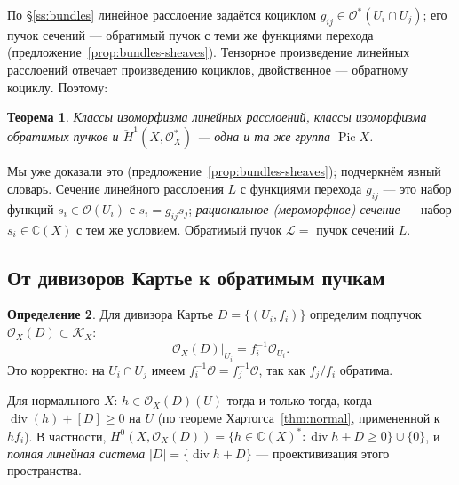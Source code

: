 \documentclass[11pt,a4paper]{article}
\theoremstyle{plain}
\newtheorem{theorem}{Теорема}[section]
\theoremstyle{definition}
\newtheorem{definition}[theorem]{Определение}
\theoremstyle{remark}
\renewcommand{\C}{\mathbb{C}}
\newcommand{\cO}{\mathcal{O}}
\newcommand{\cL}{\mathcal{L}}
\newcommand{\cK}{\mathcal{K}}
\DeclareMathOperator{\Pic}{Pic}
\DeclareMathOperator{\divv}{div}
\begin{document}
По \S\ref{ss:bundles} линейное расслоение задаётся коциклом $g_{ij}\in\cO^*(U_i\cap U_j)$;
его пучок сечений --- обратимый пучок с теми же функциями перехода
(предложение~\ref{prop:bundles-sheaves}). Тензорное произведение линейных расслоений
отвечает произведению коциклов, двойственное --- обратному коциклу. Поэтому:

\begin{theorem}\label{thm:Pic=H1}
Классы изоморфизма линейных расслоений, классы изоморфизма обратимых пучков и
$\check H^1(X,\cO_X^*)$ --- одна и та же группа $\Pic X$.
\end{theorem}

Мы уже доказали это (предложение~\ref{prop:bundles-sheaves}); подчеркнём явный словарь.
Сечение линейного расслоения $L$ с функциями перехода $g_{ij}$ --- это набор функций
$s_i\in \cO(U_i)$ с $s_i=g_{ij}s_j$; \emph{рациональное (мероморфное) сечение} --- набор
$s_i\in\C(X)$ с тем же условием. Обратимый пучок $\cL=$ пучок сечений $L$.

\subsection{От дивизоров Картье к обратимым пучкам}

\begin{definition}
Для дивизора Картье $D=\{(U_i,f_i)\}$ определим подпучок $\cO_X(D)\subset\cK_X$:
\[
\cO_X(D)|_{U_i}=f_i^{-1}\cO_{U_i}.
\]
Это корректно: на $U_i\cap U_j$ имеем $f_i^{-1}\cO=f_j^{-1}\cO$, так как $f_j/f_i$ обратима.
\end{definition}

Для нормального $X$: $h\in\cO_X(D)(U)$ тогда и только тогда, когда $\divv(h)+[D]\ge0$ на $U$
(по теореме Хартогса~\ref{thm:normal}, примененной к $hf_i$). В частности,
$H^0(X,\cO_X(D))=\{h\in\C(X)^*:\divv h+D\ge0\}\cup\{0\}$, и \emph{полная линейная система}
$|D|=\{\divv h+D\}$ --- проективизация этого пространства.
\end{document}
